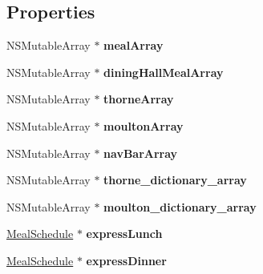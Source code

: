 \subsection*{Properties}
\begin{DoxyCompactItemize}
\item 
\hypertarget{interface_schedule_decider_a722a7ecd980db887f77341aa117ea00d}{
NSMutableArray $\ast$ {\bfseries mealArray}}
\label{interface_schedule_decider_a722a7ecd980db887f77341aa117ea00d}

\item 
\hypertarget{interface_schedule_decider_a5f6e0d7c0875a4bf073213714afdaa62}{
NSMutableArray $\ast$ {\bfseries diningHallMealArray}}
\label{interface_schedule_decider_a5f6e0d7c0875a4bf073213714afdaa62}

\item 
\hypertarget{interface_schedule_decider_a0544824187d022ca5ead2b4c65255ffb}{
NSMutableArray $\ast$ {\bfseries thorneArray}}
\label{interface_schedule_decider_a0544824187d022ca5ead2b4c65255ffb}

\item 
\hypertarget{interface_schedule_decider_a0cba61263c40c1443984c23c0208e4f2}{
NSMutableArray $\ast$ {\bfseries moultonArray}}
\label{interface_schedule_decider_a0cba61263c40c1443984c23c0208e4f2}

\item 
\hypertarget{interface_schedule_decider_ae868ea03bed0d614fc28fbe10bcc3275}{
NSMutableArray $\ast$ {\bfseries navBarArray}}
\label{interface_schedule_decider_ae868ea03bed0d614fc28fbe10bcc3275}

\item 
\hypertarget{interface_schedule_decider_a86186c57370e23ab30b1c4c4dcf1c629}{
NSMutableArray $\ast$ {\bfseries thorne\_\-dictionary\_\-array}}
\label{interface_schedule_decider_a86186c57370e23ab30b1c4c4dcf1c629}

\item 
\hypertarget{interface_schedule_decider_ab5847f4fbe1eacb8bb4265702c7f8e23}{
NSMutableArray $\ast$ {\bfseries moulton\_\-dictionary\_\-array}}
\label{interface_schedule_decider_ab5847f4fbe1eacb8bb4265702c7f8e23}

\item 
\hypertarget{interface_schedule_decider_a5cf0cafc07a1714baf4d5ffdf83c39eb}{
\hyperlink{interface_meal_schedule}{MealSchedule} $\ast$ {\bfseries expressLunch}}
\label{interface_schedule_decider_a5cf0cafc07a1714baf4d5ffdf83c39eb}

\item 
\hypertarget{interface_schedule_decider_a9bd6a0f0b4703ea0d0333a6988d0070c}{
\hyperlink{interface_meal_schedule}{MealSchedule} $\ast$ {\bfseries expressDinner}}
\label{interface_schedule_decider_a9bd6a0f0b4703ea0d0333a6988d0070c}


\end{DoxyCompactItemize}
